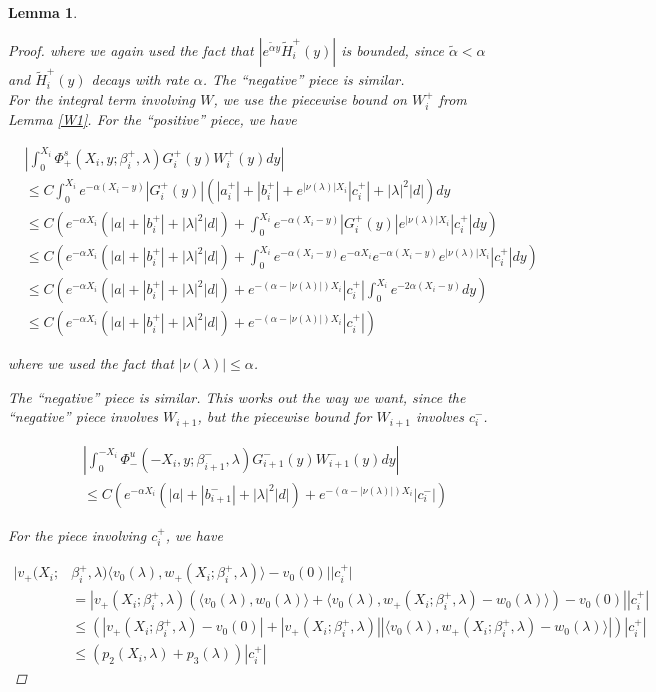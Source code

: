 \documentclass[12pt]{article}
\newtheorem{lemma}{Lemma}
\begin{document}
\begin{lemma}
\begin{proof}
where we again used the fact that $|e^{\tilde{\alpha}y} \tilde{H}_i^+(y)|$ is bounded, since $\tilde{\alpha} < \alpha$ and $\tilde{H}_i^+(y)$ decays with rate $\alpha$. The ``negative'' piece is similar.\\

For the integral term involving $W$, we use the piecewise bound on $W_i^+$ from Lemma \ref{W1}. For the ``positive'' piece, we have

\begin{align*}
&\left| \int_0^{X_i} \Phi^s_+(X_i, y; \beta_i^+, \lambda) G_i^+(y) W_i^+(y) dy \right| \\
&\leq C \int_0^{X_i} e^{-\alpha(X_i - y)}|G_i^+(y)|(|a_i^+| + |b_i^+| + e^{|\nu(\lambda)|X_i}|c_i^+| + |\lambda|^2 |d| ) dy \\
&\leq C \left( e^{-\alpha X_i} (|a| + |b_i^+| + |\lambda|^2 |d|) + \int_0^{X_i} e^{-\alpha(X_i - y)}|G_i^+(y)|e^{|\nu(\lambda)|X_i}|c_i^+| dy \right) \\
&\leq C \left( e^{-\alpha X_i} (|a| + |b_i^+| + |\lambda|^2 |d|) + \int_0^{X_i} e^{-\alpha(X_i - y)}e^{-\alpha X_i} e^{-\alpha(X_i - y)} e^{|\nu(\lambda)|X_i}|c_i^+| dy \right)\\
&\leq C \left( e^{-\alpha X_i} (|a| + |b_i^+| + |\lambda|^2 |d|) + e^{-(\alpha - |\nu(\lambda)|)X_i} |c_i^+| \int_0^{X_i} e^{-2\alpha(X_i - y)} dy \right) \\
&\leq C \left( e^{-\alpha X_i} (|a| + |b_i^+| + |\lambda|^2 |d|) + e^{-(\alpha - |\nu(\lambda)|)X_i} |c_i^+| \right)
\end{align*}

where we used the fact that $|\nu(\lambda)| \leq \alpha$.  

The ``negative'' piece is similar. This works out the way we want, since the ``negative'' piece involves $W_{i+1}$, but the piecewise bound for $W_{i+1}$ involves $c_i^-$.

\begin{align*}
&\left| \int_0^{-X_i} \Phi^u_-(-X_i, y; \beta_{i+1}^-, \lambda) G_{i+1}^-(y) W_{i+1}^-(y) dy \right| \\
&\leq C \left( e^{-\alpha X_i} (|a| + |b_{i+1}^-| + |\lambda|^2 |d|) + e^{-(\alpha - |\nu(\lambda)|)X_i} |c_i^-| \right)
\end{align*}


For the piece involving $c_i^+$, we have

\begin{align*}
|v_+(X_i; &\beta_i^+, \lambda) \langle v_0(\lambda), w_+(X_i; \beta_i^+, \lambda) \rangle - v_0(0) | |c_i^+| \\
&= |v_+(X_i; \beta_i^+, \lambda) (\langle v_0(\lambda), w_0(\lambda) \rangle + \langle v_0(\lambda), w_+(X_i; \beta_i^+, \lambda) - w_0(\lambda) \rangle) - v_0(0) | |c_i^+| \\
&\leq (|v_+(X_i; \beta_i^+, \lambda) - v_0(0)| 
+ |v_+(X_i; \beta_i^+, \lambda)||\langle v_0(\lambda), w_+(X_i; \beta_i^+, \lambda) - w_0(\lambda) \rangle|)|c_i^+| \\
&\leq (p_2(X_i, \lambda) + p_3(\lambda))|c_i^+|
\end{align*}


\end{proof}
\end{lemma}
\end{document}
